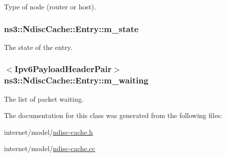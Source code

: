 Type of node (router or host). 

\subsubsection[{\texorpdfstring{m\+\_\+state}{m_state}}]{ ns3\+::\+Ndisc\+Cache\+::\+Entry\+::m\+\_\+state\hspace{0.3cm}{\ttfamily [private]}}\hypertarget{classns3_1_1NdiscCache_1_1Entry_a0f23b2879c9ba4228b48eed507bbe8f8}{}\label{classns3_1_1NdiscCache_1_1Entry_a0f23b2879c9ba4228b48eed507bbe8f8}


The state of the entry. 

\subsubsection[{\texorpdfstring{m\+\_\+waiting}{m_waiting}}]{$<${\bf Ipv6\+Payload\+Header\+Pair}$>$ ns3\+::\+Ndisc\+Cache\+::\+Entry\+::m\+\_\+waiting\hspace{0.3cm}{\ttfamily [private]}}\hypertarget{classns3_1_1NdiscCache_1_1Entry_a642bd20675037036b61a8dcf23cecf5b}{}\label{classns3_1_1NdiscCache_1_1Entry_a642bd20675037036b61a8dcf23cecf5b}


The list of packet waiting. 



The documentation for this class was generated from the following files\+:\begin{DoxyCompactItemize}
\item 
internet/model/\hyperlink{ndisc-cache_8h}{ndisc-\/cache.\+h}\item 
internet/model/\hyperlink{ndisc-cache_8cc}{ndisc-\/cache.\+cc}\end{DoxyCompactItemize}
